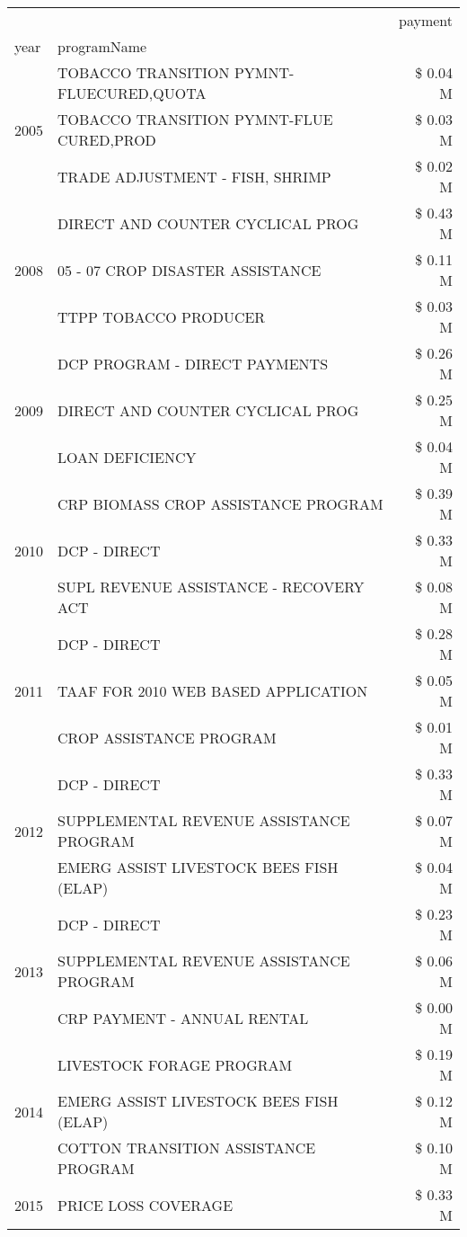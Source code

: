 \begin{tabular}{llr}
\toprule
 &  & payment \\
year & programName &  \\
\midrule
\multirow[t]{3}{*}{2005} & TOBACCO TRANSITION PYMNT-FLUECURED,QUOTA & \$ 0.04 M \\
 & TOBACCO TRANSITION PYMNT-FLUE CURED,PROD & \$ 0.03 M \\
 & TRADE ADJUSTMENT - FISH, SHRIMP & \$ 0.02 M \\
\cline{1-3}
\multirow[t]{3}{*}{2008} & DIRECT AND COUNTER CYCLICAL PROG & \$ 0.43 M \\
 & 05 - 07 CROP DISASTER ASSISTANCE & \$ 0.11 M \\
 & TTPP TOBACCO PRODUCER & \$ 0.03 M \\
\cline{1-3}
\multirow[t]{3}{*}{2009} & DCP PROGRAM - DIRECT PAYMENTS & \$ 0.26 M \\
 & DIRECT AND COUNTER CYCLICAL PROG & \$ 0.25 M \\
 & LOAN DEFICIENCY & \$ 0.04 M \\
\cline{1-3}
\multirow[t]{3}{*}{2010} & CRP BIOMASS CROP ASSISTANCE PROGRAM & \$ 0.39 M \\
 & DCP - DIRECT & \$ 0.33 M \\
 & SUPL REVENUE ASSISTANCE - RECOVERY ACT & \$ 0.08 M \\
\cline{1-3}
\multirow[t]{3}{*}{2011} & DCP - DIRECT & \$ 0.28 M \\
 & TAAF FOR 2010 WEB BASED APPLICATION & \$ 0.05 M \\
 & CROP ASSISTANCE PROGRAM & \$ 0.01 M \\
\cline{1-3}
\multirow[t]{3}{*}{2012} & DCP - DIRECT & \$ 0.33 M \\
 & SUPPLEMENTAL REVENUE ASSISTANCE PROGRAM & \$ 0.07 M \\
 & EMERG ASSIST LIVESTOCK BEES FISH (ELAP) & \$ 0.04 M \\
\cline{1-3}
\multirow[t]{3}{*}{2013} & DCP - DIRECT & \$ 0.23 M \\
 & SUPPLEMENTAL REVENUE ASSISTANCE PROGRAM & \$ 0.06 M \\
 & CRP PAYMENT - ANNUAL RENTAL & \$ 0.00 M \\
\cline{1-3}
\multirow[t]{3}{*}{2014} & LIVESTOCK FORAGE PROGRAM & \$ 0.19 M \\
 & EMERG ASSIST LIVESTOCK BEES FISH (ELAP) & \$ 0.12 M \\
 & COTTON TRANSITION ASSISTANCE PROGRAM & \$ 0.10 M \\
\cline{1-3}
\multirow[t]{3}{*}{2015} & PRICE LOSS COVERAGE & \$ 0.33 M \\

\end{tabular}
